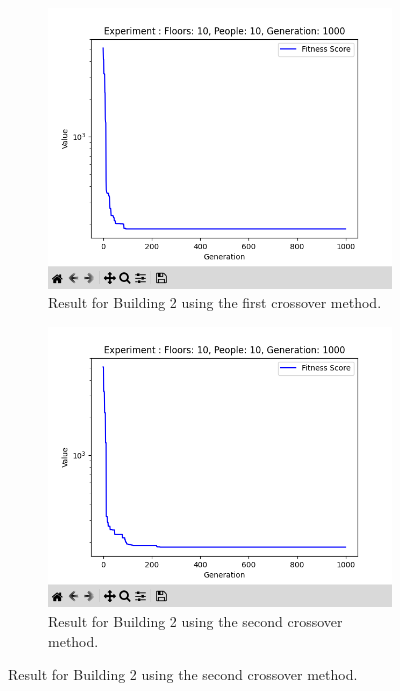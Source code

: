 \begin{figure}[h]
	\centering
	\begin{subfigure}[b]{0.45\linewidth}
		\centering
		\includegraphics[width=\linewidth]{results/B2_Co1.png}
		\caption{Result for Building 2 using the first crossover method.}
		\label{fig:results/B2_Co1}
	\end{subfigure}
	\hfill
	\begin{subfigure}[b]{0.45\linewidth}
		\centering
		\includegraphics[width=\linewidth]{results/B2_Co2.png}
		\caption{Result for Building 2 using the second crossover method.}

\end{subfigure}
\end{figure}
